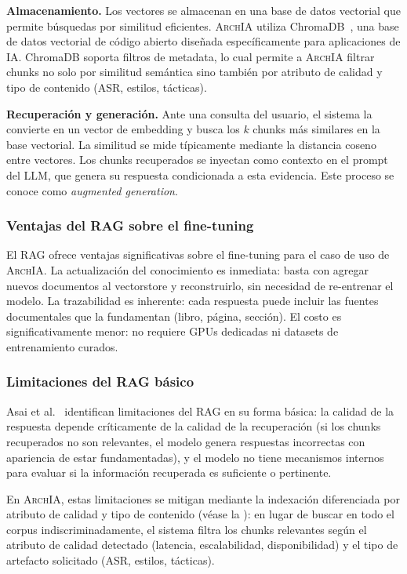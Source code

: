 \documentclass[12pt, letterpaper, oneside]{article}
\newcommand{\archia}{\textsc{ArchIA}}
\begin{document}
\textbf{Almacenamiento.} Los vectores se almacenan en una base de datos vectorial
que permite búsquedas por similitud eficientes. \archia{} utiliza
ChromaDB~\cite{chromadb2024}, una base de datos vectorial de código abierto
diseñada específicamente para aplicaciones de IA. ChromaDB soporta filtros de
metadata, lo cual permite a \archia{} filtrar chunks no solo por similitud
semántica sino también por atributo de calidad y tipo de contenido (ASR, estilos,
tácticas).

\textbf{Recuperación y generación.} Ante una consulta del usuario, el sistema
la convierte en un vector de embedding y busca los $k$ chunks más similares en
la base vectorial. La similitud se mide típicamente mediante la distancia coseno
entre vectores. Los chunks recuperados se inyectan como contexto en el prompt del
LLM, que genera su respuesta condicionada a esta evidencia. Este proceso se
conoce como \emph{augmented generation}.

\subsubsection{Ventajas del RAG sobre el fine-tuning}

El RAG ofrece ventajas significativas sobre el fine-tuning para el caso de uso de
\archia{}. La actualización del conocimiento es inmediata: basta con agregar nuevos
documentos al vectorstore y reconstruirlo, sin necesidad de re-entrenar el modelo.
La trazabilidad es inherente: cada respuesta puede incluir las fuentes documentales
que la fundamentan (libro, página, sección). El costo es significativamente menor:
no requiere GPUs dedicadas ni datasets de entrenamiento curados.

\subsubsection{Limitaciones del RAG básico}

Asai et al.~\cite{asai2023selfrag} identifican limitaciones del RAG en su forma
básica: la calidad de la respuesta depende críticamente de la calidad de la
recuperación (si los chunks recuperados no son relevantes, el modelo genera
respuestas incorrectas con apariencia de estar fundamentadas), y el modelo no
tiene mecanismos internos para evaluar si la información recuperada es suficiente
o pertinente.

En \archia{}, estas limitaciones se mitigan mediante la indexación diferenciada
por atributo de calidad y tipo de contenido (véase la
): en lugar de buscar en todo el corpus
indiscriminadamente, el sistema filtra los chunks relevantes según el atributo
de calidad detectado (latencia, escalabilidad, disponibilidad) y el tipo de
artefacto solicitado (ASR, estilos, tácticas).
\end{document}
